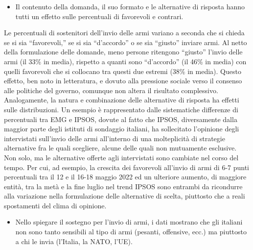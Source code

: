 \documentclass[
  openany]{book}
\providecommand{\tightlist}{%
  \setlength{\itemsep}{0pt}\setlength{\parskip}{0pt}}
\begin{document}
\begin{itemize}
\tightlist
\item
  Il contenuto della domanda, il suo formato e le alternative di risposta hanno tutti un effetto sulle percentuali di favorevoli e contrari.
\end{itemize}

Le percentuali di sostenitori dell'invio delle armi variano a seconda che si chieda se si sia ``favorevoli,'' se si sia ``d'accordo'' o se sia ``giusto'' inviare armi. Al netto della formulazione delle domande, meno persone ritengono ``giusto'' l'invio delle armi (il 33\% in media), rispetto a quanti sono ``d'accordo'' (il 46\% in media) con quelli favorevoli che si collocano tra questi due estremi (38\% in media). Questo effetto, ben noto in letteratura, e dovuto alla pressione sociale verso il consenso alle politiche del governo, comunque non altera il risultato complessivo. Analogamente, la natura e combinazione delle alternative di risposta ha effetti sulle distribuzioni. Un esempio è rappresentato dalle sistematiche differenze di percentuali tra EMG e IPSOS, dovute al fatto che IPSOS, diversamente dalla maggior parte degli istituti di sondaggio italiani, ha sollecitato l'opinione degli intervistati sull'invio delle armi all'interno di una molteplicità di strategie alternative fra le quali scegliere, alcune delle quali non mutuamente esclusive. Non solo, ma le alternative offerte agli intervistati sono cambiate nel corso del tempo. Per cui, ad esempio, la crescita dei favorevoli all'invio di armi di 6-7 punti percentuali tra il 12 e il 16-18 maggio 2022 ed un ulteriore aumento, di maggiore entità, tra la metà e la fine luglio nel trend IPSOS sono entrambi da ricondurre alla variazione nella formulazione delle alternative di scelta, piuttosto che a reali spostamenti del clima di opinione.

\begin{itemize}
\tightlist
\item
  Nello spiegare il sostegno per l'invio di armi, i dati mostrano che gli italiani non sono tanto sensibili al tipo di armi (pesanti, offensive, ecc.) ma piuttosto a chi le invia (l'Italia, la NATO, l'UE).
\end{itemize}
\end{document}
